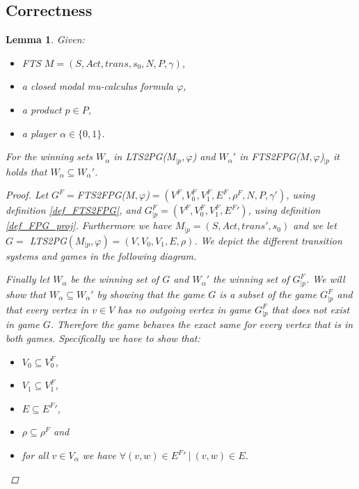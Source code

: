 \documentclass[]{article}
\newtheorem{lemma}[theorem]{Lemma}
\begin{document}
\subsection{Correctness}
\begin{lemma}
	\label{lem_PGsubPGA} Given:
	\begin{itemize}
		\item FTS $M = (S,Act, trans, s_0, N, P, \gamma)$,
		\item a closed modal mu-calculus formula $\varphi$,
		\item a product $p \in P$,
		\item a player $\alpha \in \{0,1\}$.
	\end{itemize}
	For the winning sets $W_\alpha$ in LTS2PG($M_{|p}, \varphi$) and $W_\alpha'$ in FTS2FPG($M, \varphi$)$_{|p}$ it holds that $W_\alpha \subseteq W_\alpha'$.
\begin{proof}
	Let $G^F = $FTS2FPG($M, \varphi$)$ = (V^F, V_0^F, V_1^F, E^F, \rho^F, N, P, \gamma')$, using definition \ref{def_FTS2FPG}, and $G^F_{|p} = (V^F, V_0^F, V_1^F, {E^F}')$, using definition \ref{def_FPG_proj}. Furthermore we have $M_{|p} = (S, Act, trans', s_0)$ and we let $G = $ LTS2PG$(M_{|p}, \varphi) = (V, V_0, V_1, E, \rho)$. We depict the different transition systems and games in the following diagram.
	
	
	Finally let $W_\alpha$ be the winning set of $G$ and $W_\alpha'$ the winning set of $G_{|p}^F$. We will show that $W_\alpha \subseteq W_\alpha'$ by showing that the game $G$ is a subset of the game $G_{|p}^F$ and that every vertex in $v \in V$ has no outgoing vertex in game $G_{|p}^F$ that does not exist in game $G$. Therefore the game behaves the exact same for every vertex that is in both games. Specifically we have to show that:
	\begin{itemize}
		\item $V_0 \subseteq V_0^F$,
		\item $V_1 \subseteq V_1^F$,
		\item $E \subseteq {E^F}'$,
		\item $\rho \subseteq \rho^F$ and
		\item for all $v \in V_\alpha$ we have $\forall (v,w) \in {E^F}'\ |\ (v,w)\in E$.
	\end{itemize}


\end{proof}
\end{lemma}
\end{document}
